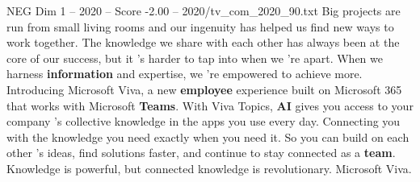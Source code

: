 \begin{textsample}{NEG Dim 1 – 2020 – Score -2.00 – 2020/tv\_com\_2020\_90.txt}  \label{ex:f1_neg_006}
Big projects are run from small living rooms and our ingenuity has helped us find new ways to work together.
The knowledge we share with each other has always been at the core of our success, but it 's harder to tap into when we 're apart.
When we harness \textbf{information} and expertise, we 're empowered to achieve more.
Introducing Microsoft Viva, a new \textbf{employee} experience built on Microsoft 365 that works with Microsoft \textbf{Teams}.
With Viva Topics, \textbf{AI} gives you access to your company 's collective knowledge in the apps you use every day.
Connecting you with the knowledge you need exactly when you need it.
So you can build on each other 's ideas, find solutions faster, and continue to stay connected as a \textbf{team}.
Knowledge is powerful, but connected knowledge is revolutionary.
Microsoft Viva.

\end{textsample}
